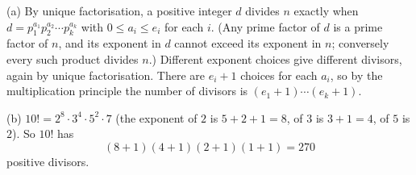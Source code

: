 (a) By unique factorisation, a positive integer \(d\) divides \(n\) exactly when \(d=p_1^{a_1}p_2^{a_2}\cdots p_k^{a_k}\) with \(0\le a_i\le e_i\) for each \(i\). (Any prime factor of \(d\) is a prime factor of \(n\), and its exponent in \(d\) cannot exceed its exponent in \(n\); conversely every such product divides \(n\).) Different exponent choices give different divisors, again by unique factorisation. There are \(e_i+1\) choices for each \(a_i\), so by the multiplication principle the number of divisors is \((e_1+1)\cdots(e_k+1)\).

(b) \(10!=2^8\cdot 3^4\cdot 5^2\cdot 7\) (the exponent of \(2\) is \(5+2+1=8\), of \(3\) is \(3+1=4\), of \(5\) is \(2\)). So \(10!\) has
\[
(8+1)(4+1)(2+1)(1+1)=\boxed{270}
\]
positive divisors.
